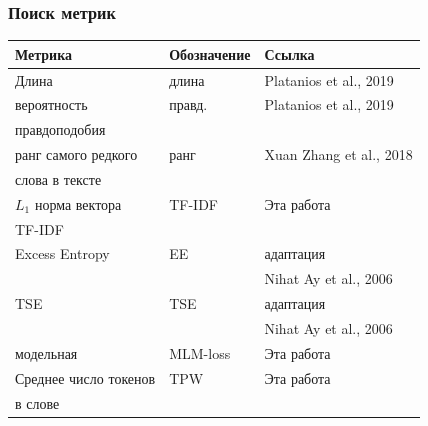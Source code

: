 \documentclass{beamer}
\begin{document}
\begin{frame}
	\frametitle{Поиск метрик}
	
	\begin{table}
		\begin{tabular}{|l|l|l|}
			\hline
			Метрика & Обозначение & Ссылка \\
			\hline
			Длина & длина & Platanios et al., 2019 \\
			\hline
			вероятность & правд. & Platanios et al., 2019 \\ 
			правдоподобия & & \\
			\hline
			ранг самого редкого & ранг & Xuan Zhang et al., 2018 \\
			слова в тексте & & \\
			\hline
			\hline
			$L_1$ норма вектора & TF-IDF & Эта работа \\
			TF-IDF & & \\
			\hline
			Excess Entropy & EE & адаптация \\
			& & Nihat Ay et al., 2006 \\
			\hline
			TSE & TSE & адаптация \\
			& & Nihat Ay et al., 2006 \\
			\hline
			модельная & MLM-loss & Эта работа \\
			\hline
			Среднее число токенов & TPW & Эта работа \\
			в слове & & \\
			\hline
		\end{tabular}
	\end{table}
	
\end{frame}
\end{document}
